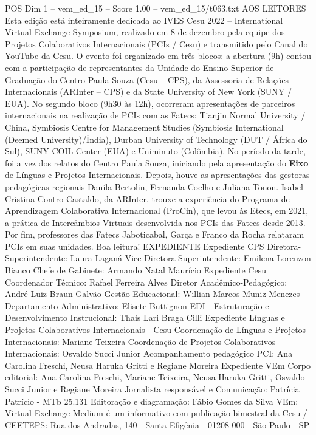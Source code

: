 \begin{textsample}{POS Dim 1 – vem\_ed\_15 – Score 1.00 – vem\_ed\_15/t063.txt}  \label{ex:f1_pos_042}
AOS LEITORES Esta edição está inteiramente dedicada ao IVES Cesu 2022 – International Virtual Exchange Symposium, realizado em 8 de dezembro pela equipe dos Projetos Colaborativos Internacionais (PCIs / Cesu) e transmitido pelo Canal do YouTube da Cesu.
O evento foi organizado em três blocos: a abertura (9h) contou com a participação de representantes da Unidade do Ensino Superior de Graduação do Centro Paula Souza (Cesu – CPS), da Assessoria de Relações Internacionais (ARInter – CPS) e da State University of New York (SUNY / EUA).
No segundo bloco (9h30 às 12h), ocorreram apresentações de parceiros internacionais na realização de PCIs com as Fatecs: Tianjin Normal University / China, Symbiosis Centre for Management Studies (Symbiosis International (Deemed University)/Índia), Durban University of Technology (DUT / África do Sul), SUNY COIL Center (EUA) e Uniminuto (Colômbia).
No período da tarde, foi a vez dos relatos do Centro Paula Souza, iniciando pela apresentação do \textbf{Eixo} de Línguas e Projetos Internacionais.
Depois, houve as apresentações das gestoras pedagógicas regionais Danila Bertolin, Fernanda Coelho e Juliana Tonon.
Isabel Cristina Contro Castaldo, da ARInter, trouxe a experiência do Programa de Aprendizagem Colaborativa Internacional (ProCin), que levou às Etecs, em 2021, a prática de Intercâmbios Virtuais desenvolvida nos PCIs das Fatecs desde 2013.
Por fim, professores das Fatecs Jaboticabal, Garça e Franco da Rocha relataram PCIs em suas unidades.
Boa leitura!
EXPEDIENTE Expediente CPS Diretora-Superintendente: Laura Laganá Vice-Diretora-Superintendente: Emilena Lorenzon Bianco Chefe de Gabinete: Armando Natal Maurício Expediente Cesu Coordenador Técnico: Rafael Ferreira Alves Diretor Acadêmico-Pedagógico: André Luiz Braun Galvão Gestão Educacional: Willian Marcos Muniz Menezes Departamento Administrativo: Elisete Buttignon EDI - Estruturação e Desenvolvimento Instrucional: Thais Lari Braga Cilli Expediente Línguas e Projetos Colaborativos Internacionais - Cesu Coordenação de Línguas e Projetos Internacionais: Mariane Teixeira Coordenação de Projetos Colaborativos Internacionais: Osvaldo Succi Junior Acompanhamento pedagógico PCI: Ana Carolina Freschi, Neusa Haruka Gritti e Regiane Moreira Expediente VEm Corpo editorial: Ana Carolina Freschi, Mariane Teixeira, Neusa Haruka Gritti, Osvaldo Succi Junior e Regiane Moreira Jornalista responsável e Comunicação: Patrícia Patrício - MTb 25.131 Editoração e diagramação: Fábio Gomes da Silva VEm: Virtual Exchange Medium é um informativo com publicação bimestral da Cesu / CEETEPS: Rua dos Andradas, 140 - Santa Efigênia - 01208-000 - São Paulo - SP

\end{textsample}
